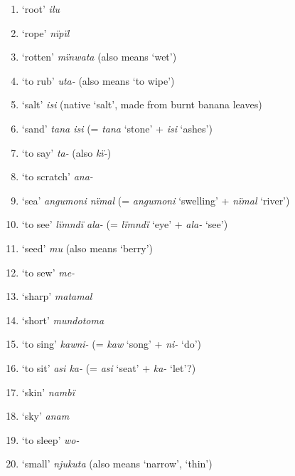 \begin{enumerate}[noitemsep, label={\arabic*}, align=left, widest=190, labelsep=1ex,leftmargin=*]
\item ‘root’ \textit{ilu}

\item ‘rope’ \textit{nïpïl}

\item ‘rotten’ \textit{mïnwata} (also means ‘wet’)

\item ‘to rub’ \textit{uta-} (also means ‘to wipe’)

\item ‘salt’ \textit{isi} (native ‘salt’, made from burnt banana leaves)

\item ‘sand’  \textit{tana isi} (= \textit{tana} ‘stone’ + \textit{isi} ‘ashes’)

\item ‘to say’ \textit{ta-} (also \textit{kï-})

\item ‘to scratch’ \textit{ana-}

\item ‘sea’ \textit{angumoni nïmal} (= \textit{angumoni} ‘swelling’ + \textit{nïmal} ‘river’)

\item ‘to see’ \textit{lïmndï ala-} (= \textit{lïmndï} ‘eye’ + \textit{ala-} ‘see’)

\item ‘seed’ \textit{mu} (also means ‘berry’)

\item ‘to sew’ \textit{me-}

\item ‘sharp’ \textit{matamal}

\item ‘short’ \textit{mundotoma}

\item ‘to sing’ \textit{kawni-} (= \textit{kaw} ‘song’ + \textit{ni-} ‘do’)

\item ‘to sit’ \textit{asi ka-} (= \textit{asi} ‘seat’ + \textit{ka-} ‘let’?)

\item ‘skin’ \textit{nambï}

\item ‘sky’ \textit{anam}

\item ‘to sleep’ \textit{wo-}

\item ‘small’ \textit{njukuta} (also means ‘narrow’, ‘thin’)


\end{enumerate}
